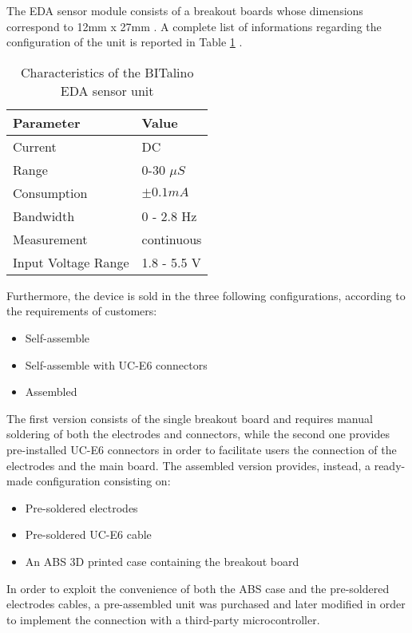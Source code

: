 The EDA sensor module consists of a breakout boards whose dimensions correspond to 12mm x 27mm \cite{bitalino-general}. A complete list of informations regarding the configuration of the unit is reported in Table \ref{toc:bitalino-features} .

\begin{table}[H]
\centering
\begin{tabular}{ll}
    \hline
    Parameter               & Value \\
    \hline
    Current                 & DC \\
    Range                   & 0-30 $\mu S$ \\
    Consumption             & $\pm 0.1 mA$ \\
    Bandwidth               & 0 - 2.8 Hz \\
    Measurement             & continuous \\
    Input Voltage Range     & 1.8 - 5.5 V \\
    \hline
\end{tabular}
\caption{Characteristics of the BITalino EDA sensor unit}
\label{toc:bitalino-features}
\end{table}

Furthermore, the device is sold in the three following configurations, according to the requirements of customers: 

\begin{itemize}
    \item Self-assemble
    \item Self-assemble with UC-E6 connectors
    \item Assembled
\end{itemize}

The first version consists of the single breakout board and requires manual soldering of both the electrodes and connectors, while the second one provides pre-installed UC-E6 connectors in order to facilitate users the connection of the electrodes and the main board. The assembled version provides, instead, a ready-made configuration consisting on: 

\begin{itemize}
    \item Pre-soldered electrodes
    \item Pre-soldered UC-E6 cable
    \item An ABS 3D printed case containing the breakout board
\end{itemize}

In order to exploit the convenience of both the ABS case and the pre-soldered electrodes cables, a pre-assembled unit was purchased and later modified in order to implement the connection with a third-party microcontroller. 






